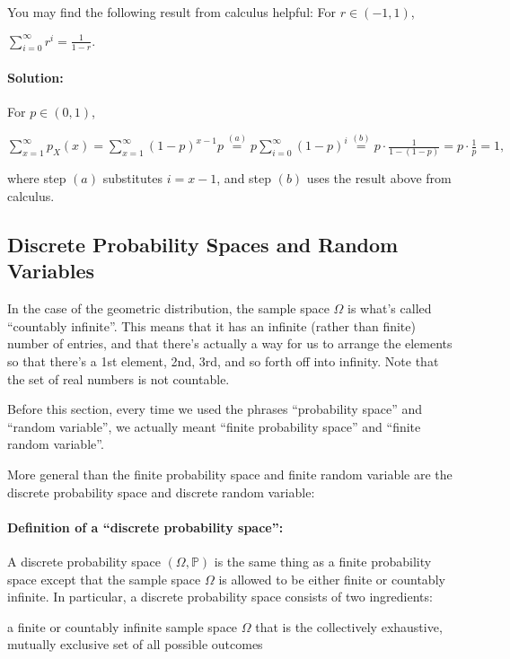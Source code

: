 \documentclass[6008notes.tex]{subfiles}
\begin{document}
You may find the following result from calculus helpful: For $r\in (-1,1)$,

{\centering$\sum _{i=0}^{\infty }r^{i}=\frac{1}{1-r}.$ \par}

\paragraph{Solution: } For $p \in (0,1)$,

{\centering$\sum _{x=1}^{\infty }p_{X}(x)=\sum _{x=1}^{\infty }(1-p)^{x-1}p\overset {(a)}{=}p\sum _{i=0}^{\infty }(1-p)^{i}\overset {(b)}{=}p\cdot \frac{1}{1-(1-p)}=p\cdot \frac{1}{p}=1,$ \par}
 
where step $(a)$ substitutes $i=x-1$, and step $(b)$ uses the result above from calculus.


\subsection{Discrete Probability Spaces and Random Variables}

In the case of the geometric distribution, the sample space $\Omega$ is what's called ``countably infinite''. This means that it has an infinite (rather than finite) number of entries, and that there's actually a way for us to arrange the elements so that there's a 1st element, 2nd, 3rd, and so forth off into infinity. Note that the set of real numbers is not countable.

Before this section, every time we used the phrases ``probability space'' and ``random variable'', we actually meant ``finite probability space'' and ``finite random variable''.

More general than the finite probability space and finite random variable are the discrete probability space and discrete random variable:

\paragraph{Definition of a ``discrete probability space'':} A discrete probability space $(\Omega ,\mathbb {P})$ is the same thing as a finite probability space except that the sample space $\Omega$ is allowed to be either finite or countably infinite. In particular, a discrete probability space consists of two ingredients:

a finite or countably infinite sample space $\Omega$ that is the collectively exhaustive, mutually exclusive set of all possible outcomes
\end{document}
